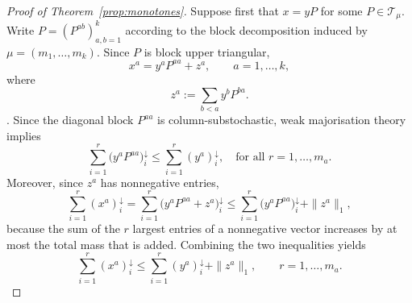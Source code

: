 \documentclass[11pt,a4paper,longbibliography]{amsart}
\numberwithin{equation}{section}
\theoremstyle{plain}
\theoremstyle{definition}
\theoremstyle{remark}
\begin{document}
			
			
			
			\begin{proof}[Proof of Theorem~\ref{prop:monotones}] 
				
				Suppose first that 
				$x=yP$ 
				for some $P\in\mathcal T_\mu$.
				Write $P=(P^{ab})_{a,b=1}^k$ according to the block decomposition induced by
				$\mu=(m_1,\ldots,m_k)$.
				Since $P$ is block upper triangular,
				$$
				x^a
				=
				y^aP^{aa}
				+
				z^a,
				\qquad
				a=1,\ldots,k,
				$$
				where
				$$
				z^a:=\sum_{b<a}y^bP^{ba}.
				$$. 
				Since the diagonal block $P^{aa}$ is column-substochastic, weak majorisation theory implies
				$$
				\sum_{i=1}^r
				\bigl(y^aP^{aa}\bigr)_i^\downarrow
				\le
				\sum_{i=1}^r
				(y^a)_i^\downarrow,\quad\text{for all $r=1,\ldots,m_a$.}
				$$
				Moreover, since $z^a$ has nonnegative entries,
				$$
				\sum_{i=1}^r
				(x^a)_i^\downarrow
				=
				\sum_{i=1}^r
				\bigl(y^aP^{aa}+z^a\bigr)_i^\downarrow
				\le
				\sum_{i=1}^r
				\bigl(y^aP^{aa}\bigr)_i^\downarrow
				+
				\|z^a\|_1,
				$$
				because the sum of the $r$ largest entries of a nonnegative vector increases
				by at most the total mass that is added.
				Combining the two inequalities yields
				\begin{equation}
					\label{eq:block}
					\sum_{i=1}^r
					(x^a)_i^\downarrow
					\le
					\sum_{i=1}^r
					(y^a)_i^\downarrow
					+
					\|z^a\|_1,
					\qquad
					r=1,\ldots,m_a.
				\end{equation}
				

\end{proof}
\end{document}
